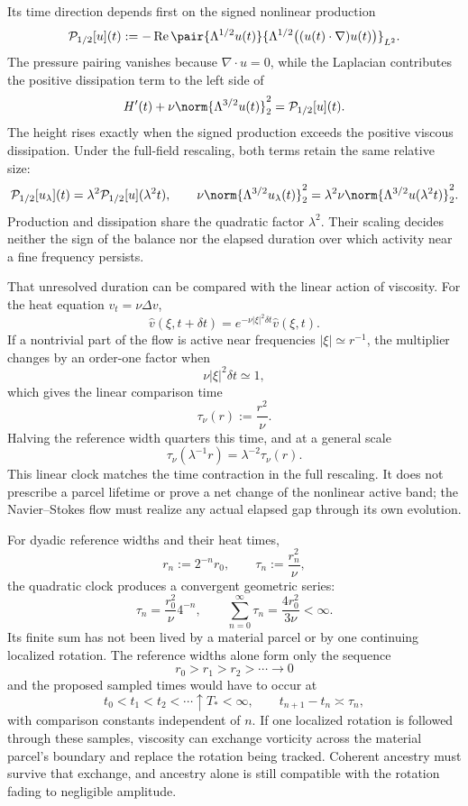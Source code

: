 
Its time direction depends first on the signed nonlinear production
\[
  \mathcal P_{1/2}[u](t)
  :=
  -\operatorname{Re}
  \pair
    {\Lambda^{1/2}u(t)}
    {\Lambda^{1/2}\bigl((u(t)\cdot\nabla)u(t)\bigr)}_{L^2}.
\]
The pressure pairing vanishes because \(\nabla\cdot u=0\), while the Laplacian contributes the positive dissipation term to the left side of
\[
  H'(t)
  +
  \nu\norm{\Lambda^{3/2}u(t)}_2^2
  =
  \mathcal P_{1/2}[u](t).
\]
The height rises exactly when the signed production exceeds the positive viscous dissipation. Under the full-field rescaling, both terms retain the same relative size:
\[
  \mathcal P_{1/2}[u_\lambda](t)
  =
  \lambda^2\mathcal P_{1/2}[u](\lambda^2t),
  \qquad
  \nu\norm{\Lambda^{3/2}u_\lambda(t)}_2^2
  =
  \lambda^2\nu\norm{\Lambda^{3/2}u(\lambda^2t)}_2^2.
\]
Production and dissipation share the quadratic factor \(\lambda^2\). Their scaling decides neither the sign of the balance nor the elapsed duration over which activity near a fine frequency persists.


That unresolved duration can be compared with the linear action of viscosity. For the heat equation \(v_t=\nu\Delta v\),
\[
  \widehat v(\xi,t+\delta t)
  =
  e^{-\nu|\xi|^2\delta t}\widehat v(\xi,t).
\]
If a nontrivial part of the flow is active near frequencies \(|\xi|\simeq r^{-1}\), the multiplier changes by an order-one factor when
\[
  \nu|\xi|^2\delta t\simeq1,
\]
which gives the linear comparison time
\[
  \tau_\nu(r)
  :=
  \frac{r^2}{\nu}.
\]
Halving the reference width quarters this time, and at a general scale
\[
  \tau_\nu(\lambda^{-1}r)
  =
  \lambda^{-2}\tau_\nu(r).
\]
This linear clock matches the time contraction in the full rescaling. It does not prescribe a parcel lifetime or prove a net change of the nonlinear active band; the Navier--Stokes flow must realize any actual elapsed gap through its own evolution.


For dyadic reference widths and their heat times,
\[
  r_n:=2^{-n}r_0,
  \qquad
  \tau_n:=\frac{r_n^2}{\nu},
\]
the quadratic clock produces a convergent geometric series:
\[
  \tau_n
  =
  \frac{r_0^2}{\nu}4^{-n},
  \qquad
  \sum_{n=0}^{\infty}\tau_n
  =
  \frac{4r_0^2}{3\nu}
  <
  \infty.
\]
Its finite sum has not been lived by a material parcel or by one continuing localized rotation. The reference widths alone form only the sequence
\[
  r_0>r_1>r_2>\cdots\longrightarrow0
\]
and the proposed sampled times would have to occur at
\[
  t_0<t_1<t_2<\cdots\uparrow T_*<\infty,
  \qquad
  t_{n+1}-t_n\asymp\tau_n,
\]
with comparison constants independent of \(n\). If one localized rotation is followed through these samples, viscosity can exchange vorticity across the material parcel's boundary and replace the rotation being tracked. Coherent ancestry must survive that exchange, and ancestry alone is still compatible with the rotation fading to negligible amplitude.


